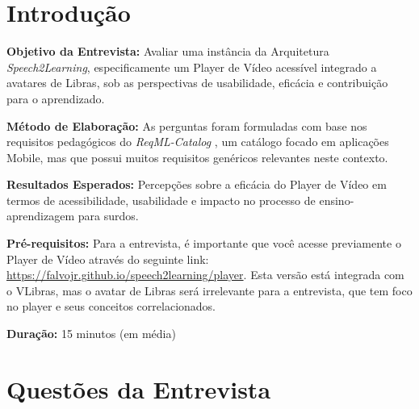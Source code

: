 \section{Introdução}

\noindent
\textbf{Objetivo da Entrevista:} Avaliar uma instância da Arquitetura \textit{Speech2Learning}, especificamente um Player de Vídeo acessível integrado a avatares de Libras, sob as perspectivas de usabilidade, eficácia e contribuição para o aprendizado.

\noindent
\textbf{Método de Elaboração:} As perguntas foram formuladas com base nos requisitos pedagógicos do \textit{ReqML-Catalog} \cite{Soad2017_FIE}, um catálogo focado em aplicações Mobile, mas que possui muitos requisitos genéricos relevantes neste contexto.

\noindent
\textbf{Resultados Esperados:} Percepções sobre a eficácia do Player de Vídeo em termos de acessibilidade, usabilidade e impacto no processo de ensino-aprendizagem para surdos.

\noindent
\textbf{Pré-requisitos:} Para a entrevista, é importante que você acesse previamente o Player de Vídeo através do seguinte link: \url{https://falvojr.github.io/speech2learning/player}. Esta versão está integrada com o VLibras, mas o avatar de Libras será irrelevante para a entrevista, que tem foco no player e seus conceitos correlacionados.

\noindent
\textbf{Duração:} 15 minutos (em média)

\section{Questões da Entrevista}

